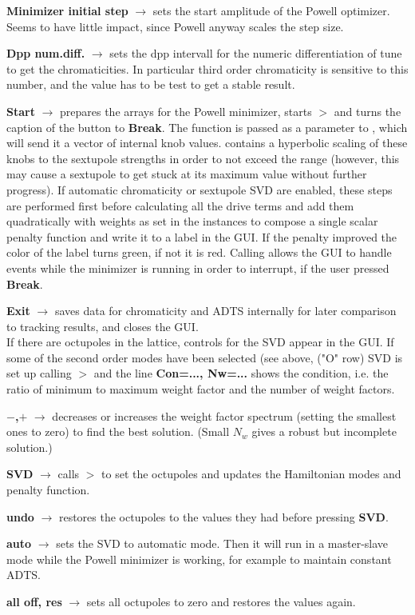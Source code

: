 \documentclass[12pt]{article}
\newcommand\code[1]{{\tt #1}}
\newcommand{\ofld}[1]{\colorbox{black!15}{{\bf #1}}}
\newcommand{\ofldx}[1]{\colorbox{black!15}{(#1)}}
\newcommand\guico[1]{{\color{blue}\code{#1}}}
\newcommand{\unico}[1]{{\color{burntorange}\code{#1}}}
\newcommand{\evcod}[2]{\ofld{#1} $\rightarrow$ \guico{#2}}
\newcommand{\prcod}[2]{\opauni{#1}$>$\unico{#2}}
\newcommand{\opaguif}[1]{\colorbox{violet!30}{{\color{black}\code{#1}}}}
\newcommand{\oguif}[1]{\hyperref[#1]{\opaguif{#1}}}
\newcommand{\opauni}[1]{\colorbox{orange!30}{{\color{black}\code{#1}}}}
\newcommand{\todo}[1]{{\color{red} #1}}
\begin{document}
{\evcod{Minimizer initial step}{EdMinAmp(KeyPress,Exit)} sets the start amplitude of the Powell optimizer. \todo{Seems to have little impact, since Powell anyway scales the step size.}

\evcod{Dpp num.diff.}{EdNumDiff(KeyPress,Exit)} sets the dpp intervall for the numeric differentiation of tune to get the chromaticities. In particular third order chromaticity is sensitive to this number, and the value has to be test to get a stable result.

\evcod{Start}{ButMinClick} prepares the arrays for the Powell minimizer, starts \prcod{mathlib}{Powell} and turns the caption of the button to \ofld{Break}. The function \guico{PenaltyFunction} is passed as a parameter to \unico{Powell}, which will send it a vector of internal knob values. \guico{PenaltyFunction} contains a hyperbolic scaling of these knobs to the sextupole strengths in order to not exceed the range (however, this may cause a sextupole to get stuck at its maximum value without further progress). If automatic chromaticity or sextupole SVD are enabled, these steps are performed first before calculating all the drive terms and add them quadratically with weights as set in the \oguif{chamframe} instances to compose a single scalar penalty function and write it to a label in the GUI. If the penalty improved the color of the label turns green, if not it is red. Calling \unico{Application.ProcessMessages} allows the GUI to handle events while the minimizer is running in order to interrupt, if the user pressed \ofld{Break}. 

\evcod{Exit}{ButExClick} saves data for chromaticity and ADTS internally for later comparison to tracking results, and closes the GUI.\\

If there are octupoles in the lattice, controls for the SVD appear in the GUI. If some of the second order modes have been selected (see above, \ofldx{"O" row} SVD is set up calling \prcod{chromlib}{Oct\_SVDCMP} and the line \ofld{Con=..., Nw=...} shows the condition, i.e. the ratio of minimum to maximum weight factor and the number of weight factors.

\evcod{$-$,$+$}{ButOsvdN(m,p)Click} decreases or increases the weight factor spectrum (setting the smallest ones to zero) to find the best solution. (Small $N_w$ gives a robust but incomplete solution.)

\evcod{SVD}{ButOsvdDoClick} calls \prcod{chromlib}{Oct\_SVBKSB} to set the octupoles and updates the Hamiltonian modes and penalty function.

\evcod{undo}{ButOsvdUndoClick} restores the octupoles to the values they had before pressing \ofld{SVD}.

\evcod{auto}{chkOsvdAutoClick} sets the SVD to automatic mode. Then it will run in a master-slave mode while the Powell minimizer is working, for example to maintain constant ADTS.

\evcod{all off, res}{ButOct(Off, Res)Click} sets all octupoles to zero and restores the values again.
}
\end{document}
